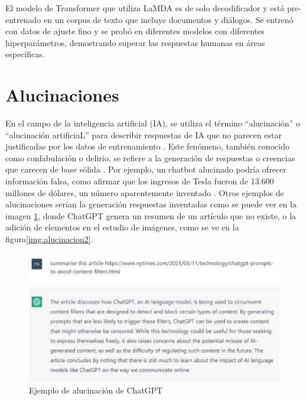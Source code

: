 El modelo de Transformer que utiliza LaMDA es de solo decodificador y está pre-entrenado en un corpus de texto que incluye documentos y diálogos. Se entrenó con datos de ajuste fino y se probó en diferentes modelos con diferentes hiperparámetros, demostrando superar las respuestas humanas en áreas específicas.

\section{Alucinaciones}
En el campo de la inteligencia artificial (IA), se utiliza el término ``alucinación'' o ``alucinación artificiaL'' para describir respuestas de IA que no parecen estar justificadas por los datos de entrenamiento \cite{edwards2023chatgpt}. Este fenómeno, también conocido como confabulación o delirio, se refiere a la generación de respuestas o creencias que carecen de base sólida \cite{ji2022survey}. Por ejemplo, un chatbot alucinado podría ofrecer información falsa, como afirmar que los ingresos de Tesla fueron de 13.600 millones de dólares, un número aparentemente inventado \cite{lin2022trick}. Otros ejemplos de alucinaciones serían la generación respuestas inventadas como se puede ver en la imagen \ref{img:alucinacion}, donde ChatGPT genera un resumen de un artículo que no existe, o la adición de elementos en el estudio de imágenes, como se ve en la figura\ref{img:alucinacion2}.

\begin{figure}[h]
	\centering
	\includegraphics[scale=1]{Imagenes/ejemploAlucinacionGPT}
	\caption{Ejemplo de alucinación de ChatGPT \cite{wikialucinacion}}
	\label{img:alucinacion}
\end{figure}

